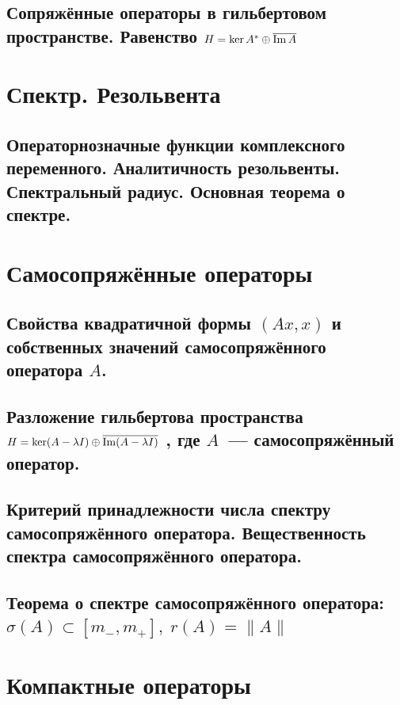 \subsection{Сопряжённые операторы в гильбертовом пространстве. Равенство $H = \ker{A^*} \oplus \overline{\operatorname{Im}{A}}$}


\section{Спектр. Резольвента}
\subsection{Операторнозначные функции комплексного переменного. Аналитичность резольвенты. Спектральный радиус. Основная теорема о спектре.}


\section{Самосопряжённые операторы}
\subsection{Свойства квадратичной формы $(Ax, x)$ и собственных значений самосопряжённого оператора $A$.}


\subsection{Разложение гильбертова пространства $H = \ker (A - \lambda I) \oplus \overline{\operatorname{Im}(A - \lambda I)}$ , где $A$~--- самосопряжённый оператор.}


\subsection{Критерий принадлежности числа спектру самосопряжённого оператора. Вещественность спектра самосопряжённого оператора.}



\subsection{Теорема о спектре самосопряжённого оператора: $\sigma(A) \subset [m_{-}, m_{+}],\; r(A) = \|A\|$}



\section{Компактные операторы}
